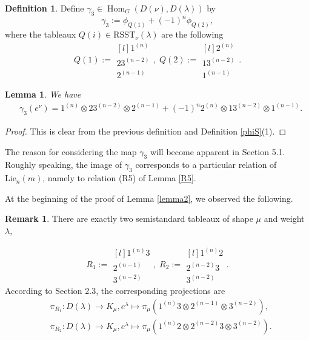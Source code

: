 \documentclass[11pt]{amsart}
\newtheorem{lem}[thm]{Lemma}
\theoremstyle{definition}
\newtheorem{defn}[thm]{Definition}
\newtheorem{rem}[thm]{Remark}
\numberwithin{equation}{section}
\DeclareMathOperator{\Hom}{Hom}
\begin{document}
\begin{defn}\label{mapg3} Define $\gamma_3  \in \Hom _G(D(\nu), D(\lambda))$ by \[\gamma_3 := \phi_{Q(1)}+ (-1)^n\phi_{Q(2)},\] where the tableaux $Q(i) \in \mathrm{RSST}_\nu(\lambda) $ are the following
	\[ Q(1):=\begin{matrix*}[l]
		1^{(n)}  \\
		23^{(n-2)} \\
		2^{(n-1)} \end{matrix*}, \; Q(2):=\begin{matrix*}[l]
		2^{(n)}  \\
		13^{(n-2)} \\
		1^{(n-1)} \end{matrix*}. \]	
\end{defn}
\begin{lem}We have \begin{align}\label{gamma3e}&\gamma_3(e^{\nu})= 1^{(n)} \otimes 23^{(n-2)} \otimes 2^{(n-1)} +(-1)^n 2^{(n)} \otimes 13^{(n-2)}\otimes1^{(n-1)}.\end{align} \end{lem}
\begin{proof} This is clear from the previous definition and Definition \ref{phiS}(1).
\end{proof}

The reason for considering the map $\gamma_3$ will become apparent in Section 5.1. Roughly speaking, the image of $\gamma_3$ corresponds to a particular relation of $\text{Lie}_n(m)$, namely to relation (R5) of Lemma \ref{R5}.

At the beginning of the proof of Lemma \ref{lemma2}, we observed the following.
\begin{rem}\label{twoss}
	There are exactly two semistandard tableaux of shape $\mu$ and weight $\lambda$, 
	
	\[ R_1:=\begin{matrix*}[l]
		1^{(n)}3  \\
		2^{(n-1)} \\
		3^{(n-2)} \end{matrix*}, \; R_2:=\begin{matrix*}[l]
		1^{(n)}2  \\
		2^{(n-2)}3 \\
		3^{(n-2)} \end{matrix*}.  \]
	According to Section 2.3, the corresponding projections are 	\begin{align*} &\pi_{R_1}:D(\lambda) \to K_\mu, e^{\lambda} \mapsto \pi_\mu(1^{(n)}3\otimes2^{(n-1)} \otimes 3^{(n-2)}), \\&\pi_{R_2}:D(\lambda) \to K_\mu, e^{\lambda} \mapsto \pi_\mu(1^{(n)}2\otimes2^{(n-2)}3 \otimes 3^{(n-2)}).\end{align*}
\end{rem}
\end{document}
